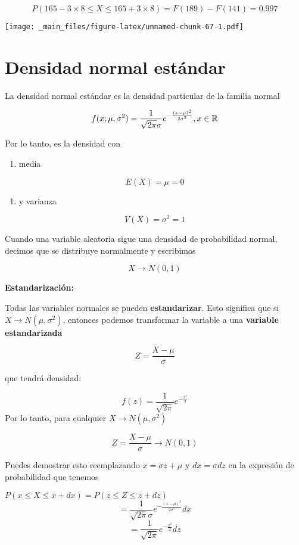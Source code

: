 \documentclass[
]{book}
\providecommand{\tightlist}{%
  \setlength{\itemsep}{0pt}\setlength{\parskip}{0pt}}
\begin{document}
\[P(165-3 \times 8 \leq X \leq 165+3\times 8)=F(189)-F(141)=0.997\]

\texttt{[image: \_main\_files/figure-latex/unnamed-chunk-67-1.pdf]}

\hypertarget{densidad-normal-estuxe1ndar}{%
\section{Densidad normal estándar}\label{densidad-normal-estuxe1ndar}}

La densidad normal estándar es la densidad particular de la familia normal

\[f(x; \mu, \sigma^2)=\frac{1}{\sqrt{2\pi}\sigma}e^{-\frac{(x-\mu)^2}{2\sigma^2}}, x \in {\Bbb R}\]

Por lo tanto, es la densidad con

\begin{enumerate}
\def\labelenumi{\arabic{enumi})}
\tightlist
\item
  media
\end{enumerate}

\[E(X)= \mu = 0\]

\begin{enumerate}
\def\labelenumi{\arabic{enumi})}
\setcounter{enumi}{1}
\tightlist
\item
  y varianza
\end{enumerate}

\[V (X)= \sigma^2 =1\]

Cuando una variable aleatoria sigue una densidad de probabilidad normal, decimos que se distribuye normalmente y escribimos

\[X \rightarrow N(0,1)\]

\textbf{Estandarización:}

Todas las variables normales se pueden \textbf{estandarizar}. Esto significa que si \(X \rightarrow N(\mu, \sigma^2)\), entonces podemos transformar la variable a
una \textbf{variable estandarizada}

\[Z=\frac{X-\mu}{\sigma}\]

que tendrá densidad:

\[f(z)=\frac{1}{ \sqrt{2\pi}}e^{-\frac{z^2}{2}}\]
Por lo tanto, para cualquier \(X \rightarrow N(\mu, \sigma^2)\)

\[Z=\frac{X-\mu}{\sigma} \rightarrow N(0, 1) \]

Puedes demostrar esto reemplazando \(x=\sigma z+\mu\) y \(dx=\sigma dz\) en la expresión de probabilidad que tenemos

\(P(x\leq X \leq x +dx)=P(z\leq Z \leq z +dz)\)
\[=\frac{1}{\sqrt{2\pi}\sigma}e^{-\frac{(x-\mu)^2}{2\sigma^2}}dx\] \[=\frac{1}{ \sqrt{2\pi}}e^{-\frac{z^2}{2}} dz\]
\end{document}
